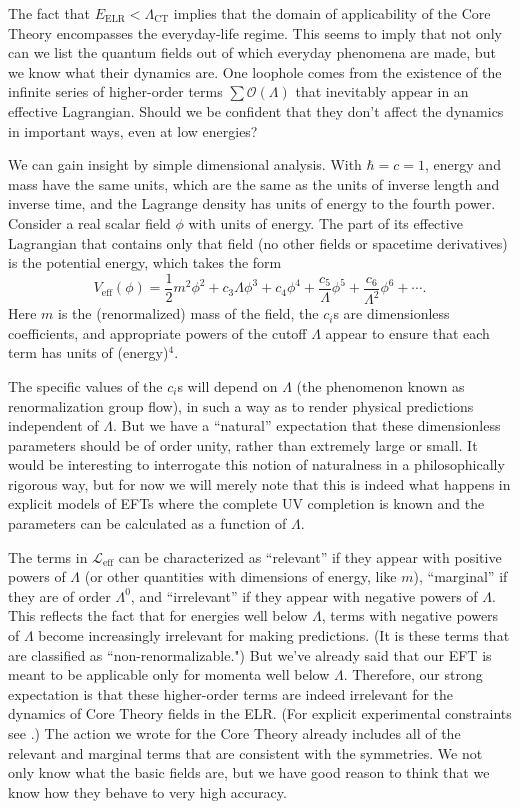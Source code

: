 \documentclass[12pt,letterpaper]{article}
\newcommand{\be}{\begin{equation}}
\newcommand{\ee}{\end{equation}}
\newcommand{\lag}{{\mathcal L}}
\newcommand{\eff}{{\mathrm{eff}}}
\begin{document}
The fact that $E_\mathrm{ELR} < \Lambda_\mathrm{CT}$ implies that the domain of applicability of the Core Theory encompasses the everyday-life regime.
This seems to imply that not only can we list the quantum fields out of which everyday phenomena are made, but we know what their dynamics are.
One loophole comes from the existence of the infinite series of higher-order terms $\sum\mathcal{O}(\Lambda)$ that inevitably appear in an effective Lagrangian.
Should we be confident that they don't affect the dynamics in important ways, even at low energies?

We can gain insight by simple dimensional analysis.
With $\hbar=c=1$, energy and mass have the same units, which are the same as the units of inverse length and inverse time, and the Lagrange density has units of energy to the fourth power.
Consider a real scalar field $\phi$ with units of energy.
The part of its effective Lagrangian that contains only that field (no other fields or spacetime derivatives) is the potential energy, which takes the form
\be
  V_\eff(\phi) = \frac{1}{2}m^2\phi^2 + c_3\Lambda \phi^3 + c_4 \phi^4 + \frac{c_5}{\Lambda}\phi^5 + \frac{c_6}{\Lambda^2}\phi^6 + \cdots.
\ee
Here $m$ is the (renormalized) mass of the field, the $c_i$s are dimensionless coefficients, and appropriate powers of the cutoff $\Lambda$ appear to ensure that each term has units of (energy)$^4$.

The specific values of the $c_i$s will depend on $\Lambda$ (the phenomenon known as renormalization group flow), in such a way as to render physical predictions independent of $\Lambda$.
But we have a ``natural'' expectation that these dimensionless parameters should be of order unity, rather than extremely large or small.
It would be interesting to interrogate this notion of naturalness in a philosophically rigorous way, but for now we will merely note that this is indeed what happens in explicit models of EFTs where the complete UV completion is known and the parameters can be calculated as a function of $\Lambda$.

The terms in $\lag_\eff$ can be characterized as ``relevant'' if they appear with positive powers of $\Lambda$ (or other quantities with dimensions of energy, like $m$), ``marginal'' if they are of order $\Lambda^0$, and ``irrelevant'' if they appear with negative powers of $\Lambda$.
This reflects the fact that for energies well below $\Lambda$, terms with negative powers of $\Lambda$ become increasingly irrelevant for making predictions.
(It is these terms that are classified as ``non-renormalizable.")
But we've already said that our EFT is meant to be applicable only for momenta well below $\Lambda$.
Therefore, our strong expectation is that these higher-order terms are indeed irrelevant for the dynamics of Core Theory fields in the ELR.
(For explicit experimental constraints see \citet{burgess1994model}.)
The action we wrote for the Core Theory already includes all of the relevant and marginal terms that are consistent with the symmetries.
We not only know what the basic fields are, but we have good reason to think that we know how they behave to very high accuracy.
\end{document}
